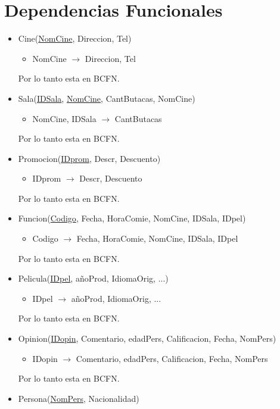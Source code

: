 \documentclass{article}
\begin{document}
\section*{Dependencias Funcionales}

  \begin{itemize}
    \item Cine(\underline{NomCine}, Direccion, Tel)
      \begin{itemize}
          \item NomCine $\rightarrow$ Direccion, Tel
      \end{itemize}
      Por lo tanto esta en BCFN.
    \item Sala(\underline{IDSala}, \underline{NomCine}, CantButacas, NomCine)
      \begin{itemize}
          \item NomCine, IDSala $\rightarrow$ CantButacas
      \end{itemize}
      Por lo tanto esta en BCFN.
    \item Promocion(\underline{IDprom}, Descr, Descuento)
      \begin{itemize}
          \item IDprom $\rightarrow$ Descr, Descuento
      \end{itemize}
      Por lo tanto esta en BCFN.
    \item Funcion(\underline{Codigo}, Fecha, HoraComie, NomCine, IDSala, IDpel)
      \begin{itemize}
          \item Codigo $\rightarrow$ Fecha, HoraComie, NomCine, IDSala, IDpel
      \end{itemize}
      Por lo tanto esta en BCFN.
    \item Pelicula(\underline{IDpel}, añoProd, IdiomaOrig, ...)
      \begin{itemize}
          \item IDpel $\rightarrow$ añoProd, IdiomaOrig, ...
      \end{itemize}
      Por lo tanto esta en BCFN.
    \item Opinion(\underline{IDopin}, Comentario, edadPers, Calificacion, Fecha, NomPers)
      \begin{itemize}
          \item IDopin $\rightarrow$ Comentario, edadPers, Calificacion, Fecha, NomPers
      \end{itemize}
      Por lo tanto esta en BCFN.
    \item Persona(\underline{NomPers}, Nacionalidad)

\end{itemize}
\end{document}
